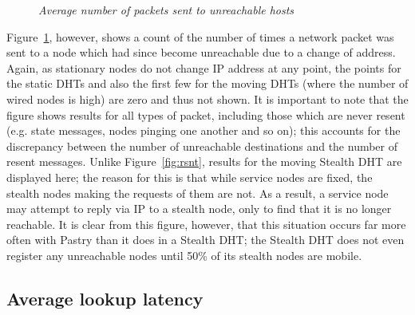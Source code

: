 \documentclass[conference]{IEEEtran}
\begin{document}
\begin{figure}[htb]
\centering {}
\caption{\em Average number of packets sent to unreachable hosts}
\label{fig:unreach}
\end{figure}




Figure~\ref{fig:unreach}, however, shows a count of the number of
times a network packet was sent to a node which had since become
unreachable due to a change of address. Again, as stationary nodes
do not change IP address at any point, the points for the static
DHTs and also the first few for the moving DHTs (where the number of
wired nodes is high) are zero and thus not shown. It is important to
note that the figure shows results for all types of packet,
including those which are never resent (e.g. state messages, nodes
pinging one another and so on); this accounts for the discrepancy
between the number of unreachable destinations and the number of
resent messages. Unlike Figure~\ref{fig:rsnt}, results for the
moving Stealth DHT are displayed here; the reason for this is that
while service nodes are fixed, the stealth nodes making the requests
of them are not. As a result, a service node may attempt to reply
via IP to a stealth node, only to find that it is no longer
reachable. It is clear from this figure, however, that this
situation occurs far more often with Pastry than it does in a
Stealth DHT; the Stealth DHT does not even register any unreachable
nodes until 50\% of its stealth nodes are mobile.

\subsection{Average lookup latency}
\label{subsect:latency}
\end{document}
